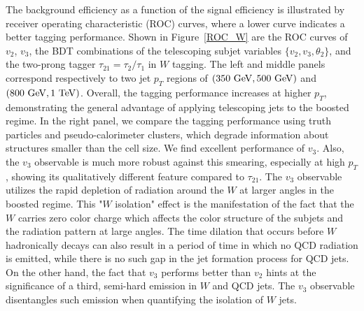 \documentclass[aps,prl,floatfix,preprintnumbers,twocolumn,groupedaddress,nofootinbib]{revtex4-1}
\begin{document}
The background efficiency as a function of the signal efficiency is illustrated by receiver operating characteristic (ROC) curves, where a lower curve indicates a better tagging performance. Shown in Figure~\ref{ROC_W} are the ROC curves of $v_2$, $v_3$, the BDT combinations of the telescoping subjet variables $\{v_2, v_3, \theta_2\}$, and the two-prong tagger $\tau_{21}=\tau_{2}/\tau_{1}$ in $W$ tagging. The left and middle panels correspond respectively to two jet $p_T$ regions of $(350~{\rm GeV}, 500~{\rm GeV})$ and $(800~{\rm GeV}, 1~{\rm TeV})$. Overall, the tagging performance increases at higher $p_T$, demonstrating the general advantage of applying telescoping jets to the boosted regime. In the right panel, we compare the tagging performance using truth particles and pseudo-calorimeter clusters, which degrade information about structures smaller than the cell size. We find excellent performance of $v_3$. Also, the $v_3$ observable is much more robust against this smearing, especially at high $p_T$, showing its qualitatively different feature compared to $\tau_{21}$. The $v_3$ observable utilizes the rapid depletion of radiation around the $W$ at larger angles in the boosted regime. This "$W$ isolation" effect is the manifestation of the fact that the $W$ carries zero color charge which affects the color structure of the subjets and the radiation pattern at large angles. The time dilation that occurs before $W$ hadronically decays can also result in a period of time in which no QCD radiation is emitted, while there is no such gap in the jet formation process for QCD jets. On the other hand, the fact that $v_3$ performs better than $v_2$ hints at the significance of a third, semi-hard emission in $W$ and QCD jets. The $v_3$ observable disentangles such emission when quantifying the isolation of $W$ jets.
\end{document}

